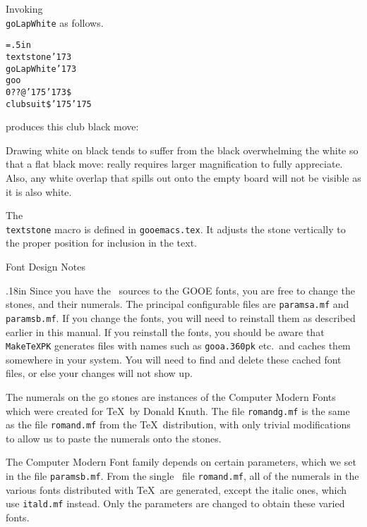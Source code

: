Invoking {\tt \\goLapWhite} as follows.

\medbreak
{\tt\parindent=.5in\obeylines\offinterlineskip
\def\[{{\char'173}}
\def\]{{\char'175}}
\\textstone\[\\goLapWhite\[\\goo \\0??@\]\[\$\\clubsuit\$\]\]
}
\medbreak

\noindent produces this club black move: 

Drawing white on black tends to suffer from the black overwhelming the white so
that a flat black move:  really
requires larger magnification to fully appreciate.  Also, any white overlap
that spills out onto the empty board will not be visible as it is also
white.

The {\tt \\textstone} macro is defined in {\tt gooemacs.tex}.  It adjusts
the stone vertically to the proper position for inclusion in the text.

\vfil\eject
\centerline{\titlefont Font Design Notes}
\vglue.18in
Since you have the \metafont\ sources to the GOOE fonts, you are free to
change the stones, and their numerals. The principal configurable files are
{\tt paramsa.mf} and {\tt paramsb.mf}. If you change the fonts, you will need
to reinstall them as described earlier in this manual.  If you reinstall the
fonts, you should be aware that {\tt MakeTeXPK} generates files with names
such as {\tt gooa.360pk} etc.\ and caches them somewhere in your system. You
will need to find and delete these cached font files, or else your changes
will not show up.

The numerals on the go stones are instances of the Computer Modern Fonts
which were created for \TeX\ by Donald Knuth. The file {\tt romandg.mf}
is the same as the file {\tt romand.mf} from the \TeX\ distribution,
with only trivial modifications to allow us to paste the numerals onto
the stones.

The Computer Modern Font family depends on certain parameters, which we set in
the file {\tt paramsb.mf}. From the single \metafont\ file {\tt romand.mf},
all of the numerals in the various fonts distributed with
\TeX\ are generated, except the italic ones, which use {\tt itald.mf} instead.
Only the parameters are changed to obtain these varied fonts.

